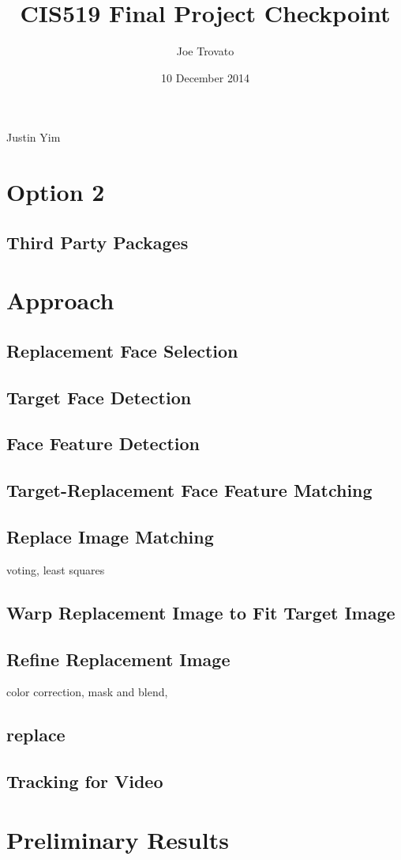 \documentclass{article}
\begin{document}
\title{CIS519 Final Project Checkpoint}
\author{Joe Trovato}{Justin Yim}
\date{10 December 2014}
\maketitle

\section{Option 2}

\subsection{Third Party Packages}


\section{Approach}
\subsection{Replacement Face Selection}
\subsection{Target Face Detection}
\subsection{Face Feature Detection}
\subsection{Target-Replacement Face Feature Matching}
\subsection{Replace Image Matching}
voting, least squares
\subsection{Warp Replacement Image to Fit Target Image}
\subsection{Refine Replacement Image}
color correction, mask and blend, 
\subsection{replace}
\subsection{Tracking for Video}


\section{Preliminary Results} 
\end{document}
